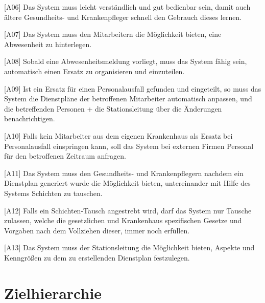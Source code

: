 \documentclass[10pt,a4paper]{article}
\begin{document}
[A06] Das System muss leicht verständlich und gut bedienbar sein, damit auch ältere Gesundheits- und Krankenpfleger schnell den Gebrauch dieses lernen.

[A07] Das System muss den Mitarbeitern die Möglichkeit bieten, eine Abwesenheit zu hinterlegen.

[A08] Sobald eine Abwesenheitsmeldung vorliegt, muss das System fähig sein, automatisch einen Ersatz zu organisieren und einzuteilen.

[A09] Ist ein Ersatz für einen Personalausfall gefunden und eingeteilt, so muss das System die Dienstpläne der betroffenen Mitarbeiter automatisch anpassen, und die betreffenden Personen + die Stationsleitung über die Änderungen benachrichtigen.

[A10] Falls kein Mitarbeiter aus dem eigenen Krankenhaus als Ersatz bei Personalausfall einspringen kann, soll das System bei externen Firmen Personal für den betroffenen Zeitraum anfragen.

[A11] Das System muss den Gesundheits- und Krankenpflegern nachdem ein Dienstplan generiert wurde die Möglichkeit bieten, untereinander mit Hilfe des Systems Schichten zu tauschen.

[A12] Falls ein Schichten-Tausch angestrebt wird, darf das System nur Tausche zulassen, welche die gesetzlichen und Krankenhaus spezifischen Gesetze und Vorgaben nach dem Vollziehen dieser, immer noch erfüllen.

[A13] Das System muss der Stationsleitung die Möglichkeit bieten, Aspekte und Kenngrößen zu dem zu erstellenden Dienstplan festzulegen. 
\section{Zielhierarchie}
\end{document}
